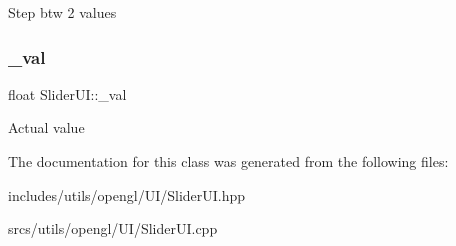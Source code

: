 Step btw 2 values \mbox{\label{class_slider_u_i_a63781e3bef83bf7582229ae881d68317}} 
\subsubsection{\texorpdfstring{\+\_\+val}{\_val}}
{\footnotesize\ttfamily float Slider\+U\+I\+::\+\_\+val\hspace{0.3cm}{\ttfamily [protected]}}

Actual value 

The documentation for this class was generated from the following files\+:\begin{DoxyCompactItemize}
\item 
includes/utils/opengl/\+U\+I/Slider\+U\+I.\+hpp\item 
srcs/utils/opengl/\+U\+I/Slider\+U\+I.\+cpp\end{DoxyCompactItemize}
